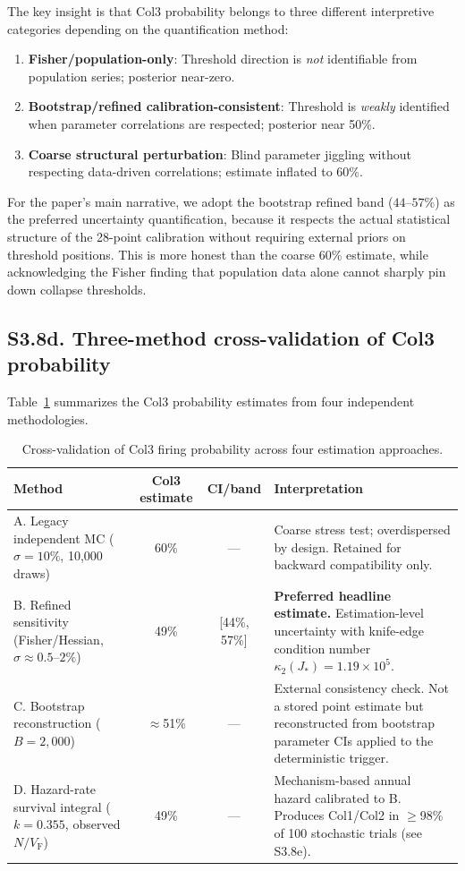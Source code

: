 \documentclass[11pt]{article}
\newcommand{\VF}{V_{\mathrm{F}}}
\begin{document}
The key insight is that Col3 probability belongs to three different interpretive categories depending on the quantification method:
\begin{enumerate}
\item \textbf{Fisher/population-only}: Threshold direction is \emph{not} identifiable from population series; posterior near-zero.
\item \textbf{Bootstrap/refined calibration-consistent}: Threshold is \emph{weakly} identified when parameter correlations are respected; posterior near 50\%.
\item \textbf{Coarse structural perturbation}: Blind parameter jiggling without respecting data-driven correlations; estimate inflated to 60\%.
\end{enumerate}

For the paper's main narrative, we adopt the bootstrap refined band ($44$--$57\%$) as the preferred uncertainty quantification, because it respects the actual statistical structure of the 28-point calibration without requiring external priors on threshold positions. This is more honest than the coarse 60\% estimate, while acknowledging the Fisher finding that population data alone cannot sharply pin down collapse thresholds.

\subsection*{S3.8d. Three-method cross-validation of Col3 probability}

Table~\ref{tab:S3_col3_crossval} summarizes the Col3 probability estimates from four independent methodologies.

\begin{table}[H]
\centering
\caption{Cross-validation of Col3 firing probability across four estimation approaches.}
\label{tab:S3_col3_crossval}
\begin{tabular}{lccp{6cm}}
\toprule
Method & Col3 estimate & CI/band & Interpretation \\
\midrule
A. Legacy independent MC ($\sigma=10\%$, 10{,}000 draws) & 60\% & --- & Coarse stress test; overdispersed by design. Retained for backward compatibility only. \\
B. Refined sensitivity (Fisher/Hessian, $\sigma\approx 0.5$--$2\%$) & 49\% & [44\%, 57\%] & \textbf{Preferred headline estimate.} Estimation-level uncertainty with knife-edge condition number $\kappa_2(J_*)=1.19\times 10^5$. \\
C. Bootstrap reconstruction ($B=2{,}000$) & $\approx$51\% & --- & External consistency check. Not a stored point estimate but reconstructed from bootstrap parameter CIs applied to the deterministic trigger. \\
D. Hazard-rate survival integral ($k=0.355$, observed $N/\VF$) & 49\% & --- & Mechanism-based annual hazard calibrated to B. Produces Col1/Col2 in $\ge$98\% of 100 stochastic trials (see S3.8e). \\
\bottomrule
\end{tabular}
\end{table}
\end{document}
